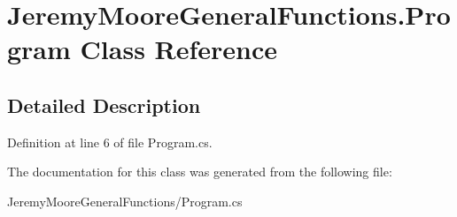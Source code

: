 \hypertarget{class_jeremy_moore_general_functions_1_1_program}{}\section{Jeremy\+Moore\+General\+Functions.\+Program Class Reference}
\label{class_jeremy_moore_general_functions_1_1_program}


\subsection{Detailed Description}


Definition at line 6 of file Program.\+cs.



The documentation for this class was generated from the following file\+:\begin{DoxyCompactItemize}
\item 
Jeremy\+Moore\+General\+Functions/Program.\+cs\end{DoxyCompactItemize}
